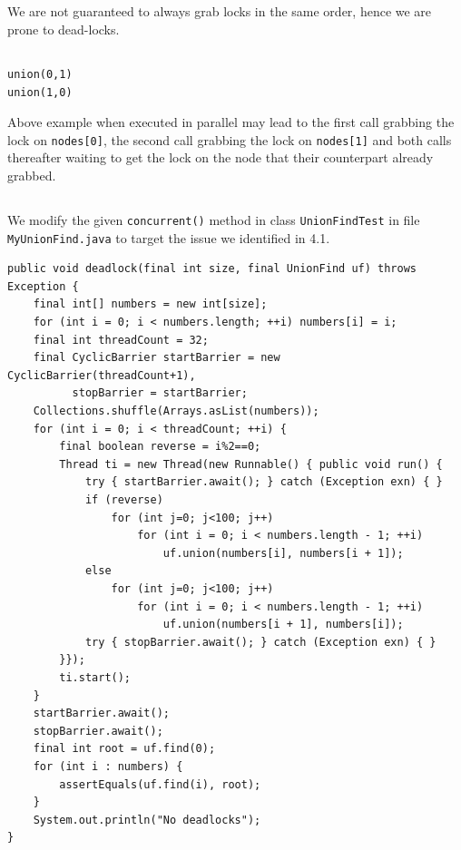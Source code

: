 \documentclass[a5paper]{article}
\begin{document}
\subsection{}
We are not guaranteed to always grab locks in the same order, hence we are prone to dead-locks.

\subsection{}

\begin{lstlisting}
union(0,1)
union(1,0)
\end{lstlisting}

Above example when executed in parallel may lead to the first call grabbing the lock on \texttt{nodes[0]}, the second call grabbing the lock on \texttt{nodes[1]} and both calls thereafter waiting to get the lock on the node that their counterpart already grabbed.

\subsection{}
We modify the given \texttt{concurrent()} method in class \texttt{UnionFindTest} in file \texttt{MyUnionFind.java} to target the issue we identified in 4.1.
\begin{lstlisting}
public void deadlock(final int size, final UnionFind uf) throws Exception {
    final int[] numbers = new int[size];
    for (int i = 0; i < numbers.length; ++i) numbers[i] = i;
    final int threadCount = 32;
    final CyclicBarrier startBarrier = new CyclicBarrier(threadCount+1), 
          stopBarrier = startBarrier;
    Collections.shuffle(Arrays.asList(numbers));
    for (int i = 0; i < threadCount; ++i) {
        final boolean reverse = i%2==0;
        Thread ti = new Thread(new Runnable() { public void run() {
            try { startBarrier.await(); } catch (Exception exn) { }
            if (reverse)
                for (int j=0; j<100; j++)
                    for (int i = 0; i < numbers.length - 1; ++i) 
                        uf.union(numbers[i], numbers[i + 1]);
            else 
                for (int j=0; j<100; j++)
                    for (int i = 0; i < numbers.length - 1; ++i) 
                        uf.union(numbers[i + 1], numbers[i]);
            try { stopBarrier.await(); } catch (Exception exn) { }
        }});
        ti.start();
    }
    startBarrier.await();
    stopBarrier.await();
    final int root = uf.find(0);
    for (int i : numbers) {
        assertEquals(uf.find(i), root);
    }
    System.out.println("No deadlocks");
}
\end{lstlisting}
\end{document}
